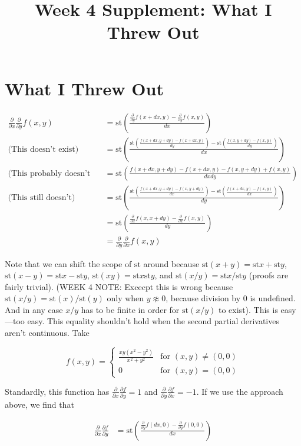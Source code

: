 \documentclass{article}
\title{Week 4 Supplement: What I Threw Out}
\newcommand{\st}[1]{\mathrm{st}#1}
\newcommand{\del}{\partial}
\begin{document}
\section*{What I Threw Out}

\begin{align*}
    \frac{\del}{\del x} \frac{\del}{\del y} f(x, y) &= \st{\left(\frac{\frac{\del}{\del y} f(x + dx, y) - \frac{\del}{\del y} f(x, y)}{dx}\right)} \\
    \mbox{(This doesn't exist)} &= \st{\left(\frac{\st{\left(\frac{f(x+dx, y+dy) - f(x+dx, y)}{dy}\right)} - \st{\left(\frac{f(x, y+dy)- f(x, y)}{dy}\right)}}{dx}\right)} \\
    \mbox{(This probably doesn't either)} &= \st{\left(\frac{f(x+dx,y+dy)-f(x+dx,y)-f(x,y+dy)+f(x,y)}{dxdy}\right)} \\
    \mbox{(This still doesn't)} &= \st{\left(\frac{\st{\left(\frac{f(x+dx, y+dy) - f(x, y+dy)}{dx}\right)} - \st{\left(\frac{f(x+dx, y)- f(x, y)}{dx}\right)}}{dy}\right)} \\
    &= \st{\left(\frac{\frac{\del}{\del x} f(x, x+dy) - \frac{\del}{\del x} f(x, y)}{dy}\right)} \\
    &= \frac{\del}{\del y} \frac{\del}{\del x} f(x, y)
    \end{align*}
    
    Note that we can shift the scope of $\st{}$ around because $\st(x+y) = \st x + \st y$, $\st (x - y) = \st x - \st y$, $\st (xy) = \st x \st y$, and $\st (x/y) = \st x / \st y$ (proofs are fairly trivial). (WEEK 4 NOTE: Excecpt this is wrong because $\st (x/y) = \st (x) / \st (y)$ only when $y \not\approx 0$, because division by $0$ is undefined. And in any case $x/y$ has to be finite in order for $\st (x/y)$ to exist). This is easy---too easy. This equality shouldn't hold when the second partial derivatives aren't continuous. Take
    
    \[ f(x, y) = \begin{cases}
    \frac{xy(x^2-y^2)}{x^2+y^2} & \mbox{for } (x, y) \neq (0, 0) \\
    0 & \mbox {for } (x, y) = (0, 0)
    \end{cases} \]
    
    Standardly, this function has $\frac{\del}{\del x} \frac{\del f}{\del y} = 1$ and $\frac{\del}{\del y} \frac{\del f}{\del x} = -1$. If we use the approach above, we find that
    
    
    \begin{align*}
    \frac{\del}{\del x}\frac{\del f}{\del y} &= \st{\left( \frac{\frac{\del}{\del y} f(dx, 0) - \frac{\del}{\del y} f(0, 0)}{dx} \right)}
    \end{align*}
    
\end{document}
